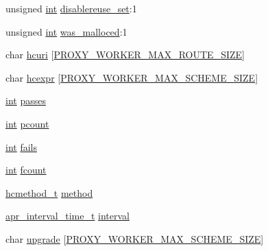 \begin{DoxyCompactItemize}
\item 
unsigned \hyperlink{pcre_8txt_a42dfa4ff673c82d8efe7144098fbc198}{int} \hyperlink{structproxy__worker__shared_a59517b66817855941466c2af0a6c8652}{disablereuse\+\_\+set}\+:1
\item 
unsigned \hyperlink{pcre_8txt_a42dfa4ff673c82d8efe7144098fbc198}{int} \hyperlink{structproxy__worker__shared_a52212ee9b0e0217ce6d8a0a29261b7ec}{was\+\_\+malloced}\+:1
\item 
char \hyperlink{structproxy__worker__shared_af5758d7e4b7cc9ef83dd9ae1b333b6f6}{hcuri} \mbox{[}\hyperlink{group__MOD__PROXY_ga2728b95ba24f7a531b844a9a851a9392}{P\+R\+O\+X\+Y\+\_\+\+W\+O\+R\+K\+E\+R\+\_\+\+M\+A\+X\+\_\+\+R\+O\+U\+T\+E\+\_\+\+S\+I\+ZE}\mbox{]}
\item 
char \hyperlink{structproxy__worker__shared_aa5528297a17f3a4109d80e0ae408da16}{hcexpr} \mbox{[}\hyperlink{group__MOD__PROXY_ga79e4d8747fce219f39b35c301ca22b71}{P\+R\+O\+X\+Y\+\_\+\+W\+O\+R\+K\+E\+R\+\_\+\+M\+A\+X\+\_\+\+S\+C\+H\+E\+M\+E\+\_\+\+S\+I\+ZE}\mbox{]}
\item 
\hyperlink{pcre_8txt_a42dfa4ff673c82d8efe7144098fbc198}{int} \hyperlink{structproxy__worker__shared_adffcf8cafb074dc8260d3280c59640cd}{passes}
\item 
\hyperlink{pcre_8txt_a42dfa4ff673c82d8efe7144098fbc198}{int} \hyperlink{structproxy__worker__shared_a38d26d44851c365440b93389835b7543}{pcount}
\item 
\hyperlink{pcre_8txt_a42dfa4ff673c82d8efe7144098fbc198}{int} \hyperlink{structproxy__worker__shared_aadf66cbefb521ebb6c0078c6d97d18a6}{fails}
\item 
\hyperlink{pcre_8txt_a42dfa4ff673c82d8efe7144098fbc198}{int} \hyperlink{structproxy__worker__shared_a0c23e121aa817502fc0daa4b7e5f5675}{fcount}
\item 
\hyperlink{group__MOD__PROXY_ga4e8622ade6bde29385df7b89c9b94e71}{hcmethod\+\_\+t} \hyperlink{structproxy__worker__shared_a2a36171f268b948bbefe3743cf4e867f}{method}
\item 
\hyperlink{group__apr__time_gaae2129185a395cc393f76fabf4f43e47}{apr\+\_\+interval\+\_\+time\+\_\+t} \hyperlink{structproxy__worker__shared_a9b325701b7c6ef0cf856175cc5d9b575}{interval}
\item 
char \hyperlink{structproxy__worker__shared_a8ee12c9fa2ba8cc4e7def393fb6ce023}{upgrade} \mbox{[}\hyperlink{group__MOD__PROXY_ga79e4d8747fce219f39b35c301ca22b71}{P\+R\+O\+X\+Y\+\_\+\+W\+O\+R\+K\+E\+R\+\_\+\+M\+A\+X\+\_\+\+S\+C\+H\+E\+M\+E\+\_\+\+S\+I\+ZE}\mbox{]}
\end{DoxyCompactItemize}


